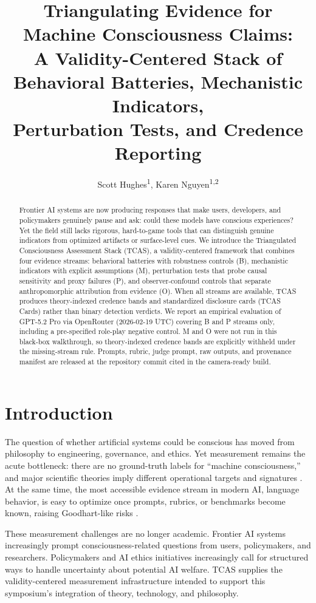 \documentclass[letterpaper]{article}
\title{Triangulating Evidence for Machine Consciousness Claims:\\
A Validity-Centered Stack of Behavioral Batteries, Mechanistic Indicators,\\
Perturbation Tests, and Credence Reporting}
\author{
Scott Hughes\textsuperscript{\rm 1},
Karen Nguyen\textsuperscript{\rm 1,\rm 2}
}
\begin{document}
\maketitle

\begin{abstract}
Frontier AI systems are now producing responses that make users, developers, and policymakers genuinely pause and ask: could these models have conscious experiences? Yet the field still lacks rigorous, hard-to-game tools that can distinguish genuine indicators from optimized artifacts or surface-level cues. We introduce the Triangulated Consciousness Assessment Stack (TCAS), a validity-centered framework that combines four evidence streams: behavioral batteries with robustness controls (B), mechanistic indicators with explicit assumptions (M), perturbation tests that probe causal sensitivity and proxy failures (P), and observer-confound controls that separate anthropomorphic attribution from evidence (O). When all streams are available, TCAS produces theory-indexed credence bands and standardized disclosure cards (TCAS Cards) rather than binary detection verdicts. We report an empirical evaluation of GPT-5.2 Pro via OpenRouter (2026-02-19 UTC) covering B and P streams only, including a pre-specified role-play negative control. M and O were not run in this black-box walkthrough, so theory-indexed credence bands are explicitly withheld under the missing-stream rule. Prompts, rubric, judge prompt, raw outputs, and provenance manifest are released at the repository commit cited in the camera-ready build.
\end{abstract}

\section{Introduction}

The question of whether artificial systems could be conscious has moved from philosophy to engineering, governance, and ethics. Yet measurement remains the acute bottleneck: there are no ground-truth labels for ``machine consciousness,'' and major scientific theories imply different operational targets and signatures \citep{delpin2021,mashour2020,tononi2016}. At the same time, the most accessible evidence stream in modern AI, language behavior, is easy to optimize once prompts, rubrics, or benchmarks become known, raising Goodhart-like risks \citep{bennett2025,manheim2018}.

These measurement challenges are no longer academic. Frontier AI systems increasingly prompt consciousness-related questions from users, policymakers, and researchers. Policymakers and AI ethics initiatives increasingly call for structured ways to handle uncertainty about potential AI welfare. TCAS supplies the validity-centered measurement infrastructure intended to support this symposium's integration of theory, technology, and philosophy.
\end{document}
